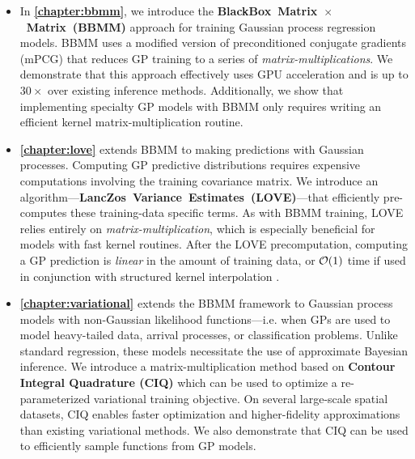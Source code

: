 \begin{itemize}
  \item In {\bf \cref{chapter:bbmm}}, we introduce the {\bf BlackBox~Matrix~$\times$~Matrix~(BBMM)} approach for training Gaussian process regression models.
    BBMM uses a modified version of preconditioned conjugate gradients (mPCG) that reduces GP training to a series of \emph{matrix-multiplications}.
    We demonstrate that this approach effectively uses GPU acceleration and is up to $30\times$ over existing inference methods.
    Additionally, we show that implementing specialty GP models with BBMM only requires writing an efficient kernel matrix-multiplication routine.

  \item {\bf \cref{chapter:love}} extends BBMM to making predictions with Gaussian processes.
    Computing GP predictive distributions requires expensive computations involving the training covariance matrix.
    We introduce an algorithm---{\bf LancZos~Variance~Estimates~(LOVE)}---that efficiently pre-computes these training-data specific terms.
    As with BBMM training, LOVE relies entirely on \emph{matrix-multiplication}, which is especially beneficial for models with fast kernel routines.
    After the LOVE precomputation, computing a GP prediction is \emph{linear} in the amount of training data, or $\bigo{1}$ time if used in conjunction with structured kernel interpolation \cite{wilson2015kernel}.

  \item {\bf \cref{chapter:variational}} extends the BBMM framework to Gaussian process models with non-Gaussian likelihood functions---i.e. when GPs are used to model heavy-tailed data, arrival processes, or classification problems.
    Unlike standard regression, these models necessitate the use of approximate Bayesian inference.
    We introduce a matrix-multiplication method based on {\bf Contour Integral Quadrature (CIQ)} which can be used to optimize a re-parameterized variational training objective.
    On several large-scale spatial datasets, CIQ enables faster optimization and higher-fidelity approximations than existing variational methods.
    We also demonstrate that CIQ can be used to efficiently sample functions from GP models.


\end{itemize}
